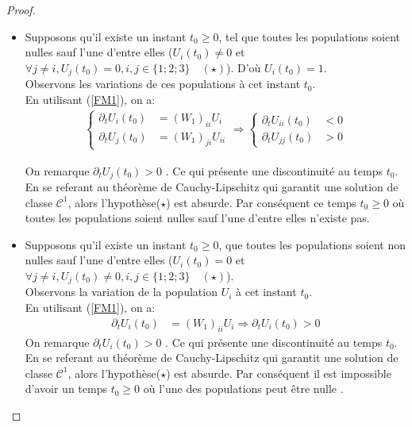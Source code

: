 \documentclass[12pt,a4paper,openany,oneside]{book}
\begin{document}
{{{{{{\begin{proof}
\begin{enumerate}
\begin{itemize}[label=$\bullet$]
\item Supposons qu'il existe un instant $t_{0}\geq 0$, tel que toutes les populations soient nulles sauf l'une d'entre elles ($ U_{i}(t_{0})\neq 0 $ et $\forall j\neq i, U_{j}(t_{0})=0 , i, j \in \{1;2;3\} \quad (\star) $). D'où $ U_{i}(t_{0})= 1 $. \\
Observons les variations de ces populations à cet instant $ t_{0} $.\\
En utilisant (\ref{FM1}), on a:
\begin{eqnarray*}
 \left\{
 \begin{split}
 \partial_{t}U_{i}(t_{0}) & =  \left(W_{1}\right)_{ii}U_{i}\\
 \partial_{t}U_{j}(t_{0}) & = \left(W_{1}\right)_{ji}U_{ii}
  \end{split}  
   \right. \Rightarrow \left\{
 \begin{split}
 \partial_{t}U_{ii}(t_{0}) & <0 \\
\partial_{t}U_{jj}(t_{0}) & >0
  \end{split}  
   \right.    
  \end{eqnarray*}

On remarque $\partial_{t}U_{j}(t_{0})>0 $ . Ce qui présente une discontinuité au temps $t_{0}$.\\
En se referant au théorème de Cauchy-Lipschitz qui garantit une solution de classe $\mathcal{C}^{1}$, alors l'hypothèse($\star$) est absurde. Par conséquent ce temps $t_{0}\geq0$  où toutes les populations soient nulles sauf l'une d'entre elles n'existe pas.

\item Supposons qu'il existe un instant $t_{0}\geq 0$, que toutes les populations soient non nulles sauf l'une d'entre elles ($ U_{i}(t_{0})= 0 $ et $\forall j\neq i, U_{j}(t_{0})\neq 0 , i, j \in \{1;2;3\} \quad (\star) $).\\
Observons la variation de la population $ U_{i} $ à cet instant $ t_{0} $.\\
En utilisant (\ref{FM1}), on a:
\begin{eqnarray*}
 \partial_{t}U_{i}(t_{0}) & =  \left(W_{1}\right)_{ii}U_{i}\Rightarrow \partial_{t}U_{i}(t_{0})>0     
  \end{eqnarray*}
On remarque $\partial_{t}U_{i}(t_{0})>0 $ . Ce qui présente une discontinuité au temps $t_{0}$.\\
En se referant au théorème de Cauchy-Lipschitz qui garantit une solution de classe $\mathcal{C}^{1}$, alors l'hypothèse($\star$) est absurde. Par conséquent il est impossible d'avoir un temps $t_{0}\geq0$ où l'une des populations peut être nulle .
 

\end{itemize}
\end{enumerate}
\end{proof}}}}}}}
\end{document}
